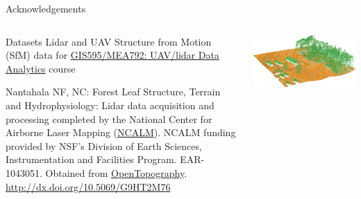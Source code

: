 \documentclass[xcolor={dvipsnames,usenames},beamer,aspectratio=169]{beamer}
\begin{document}
\begin{frame}{Acknowledgements}

\begin{columns}
\begin{column}{0.5\textwidth}

\begin{block}{Datasets}
\footnotesize
Lidar and UAV Structure from Motion (SfM) data for
\href{http://ncsu-osgeorel.github.io/uav-lidar-analytics-course/}%
  {GIS595/MEA792: UAV/lidar Data Analytics} course

\smallskip

Nantahala NF, NC: Forest Leaf Structure, Terrain and Hydrophysiology:
Lidar data acquisition and processing completed
by the National Center for Airborne Laser Mapping (\href{http://www.ncalm.org}{NCALM}).
NCALM funding provided by NSF's Division of Earth Sciences, Instrumentation and Facilities Program.
EAR-1043051.
Obtained from \href{http://www.opentopography.org/}{OpenTopography}.
\url{http://dx.doi.org/10.5069/G9HT2M76}
\end{block}

\end{column}
\begin{column}{0.4\textwidth}

\begin{center}
  \includegraphics[width=\textwidth]{lidar_secref_3d}
\end{center}

\end{column}
\end{columns}

\end{frame}
\end{document}
